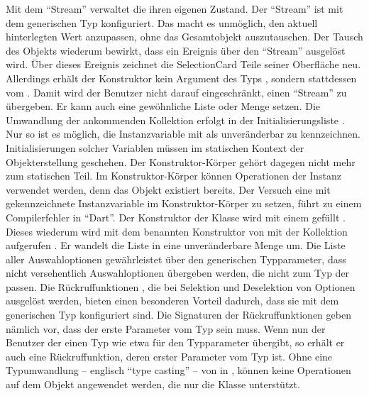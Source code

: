 Mit dem \enquote{Stream}  verwaltet die  ihren eigenen Zustand.
Der \enquote{Stream} ist mit dem generischen Typ  konfiguriert.
Das macht es unmöglich, den aktuell hinterlegten Wert anzupassen, ohne das Gesamtobjekt auszutauschen.
Der Tausch des Objekts wiederum bewirkt, dass ein Ereignis über den \enquote{Stream} ausgelöst wird. Über dieses Ereignis zeichnet die SelectionCard Teile seiner Oberfläche neu. Allerdings erhält der Konstruktor kein Argument des Typs , sondern stattdessen vom  . Damit wird der Benutzer nicht darauf eingeschränkt, einen \enquote{Stream} zu übergeben. Er kann auch eine gewöhnliche Liste oder Menge setzen. Die Umwandlung der ankommenden Kollektion erfolgt in der Initialisierungsliste . Nur so ist es möglich, die Instanzvariable mit  als unveränderbar zu kennzeichnen. Initialisierungen solcher Variablen müssen im statischen Kontext der Objekterstellung geschehen. Der Konstruktor-Körper gehört dagegen nicht mehr zum statischen Teil. Im Konstruktor-Körper können Operationen der Instanz verwendet werden, denn das Objekt existiert bereits. Der Versuch eine mit  gekennzeichnete Instanzvariable im Konstruktor-Körper zu setzen, führt zu einem Compilerfehler in \enquote{Dart}. Der Konstruktor  der Klasse  wird mit einem  gefüllt . Dieses wiederum wird mit dem benannten Konstruktor  von  mit der Kollektion aufgerufen . Er wandelt die  Liste in eine unveränderbare Menge um. Die Liste aller Auswahloptionen   gewährleistet über den generischen Typparameter, dass nicht versehentlich Auswahloptionen übergeben werden, die nicht zum Typ der  passen. Die Rückruffunktionen , die bei Selektion und Deselektion von Optionen ausgelöst werden, bieten einen besonderen Vorteil dadurch, dass sie mit dem generischen Typ konfiguriert sind. Die Signaturen der Rückruffunktionen  geben nämlich vor, dass der erste Parameter vom Typ  sein muss. Wenn nun der Benutzer der  einen Typ wie etwa  für den Typparameter übergibt, so erhält er auch eine Rückruffunktion, deren erster Parameter vom Typ  ist. Ohne eine Typumwandlung -- englisch \enquote{type casting} -- von  in , können keine Operationen auf dem Objekt angewendet werden, die nur die Klasse  unterstützt.

